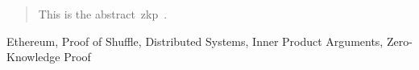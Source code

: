 
\begin{abstract}
    This is the abstract~\gls{zkp}~\cite{greenwade1993}.
\end{abstract}

\begin{IEEEkeywords}
    Ethereum, Proof of Shuffle, Distributed Systems, Inner Product Arguments, Zero-Knowledge Proof
\end{IEEEkeywords}
